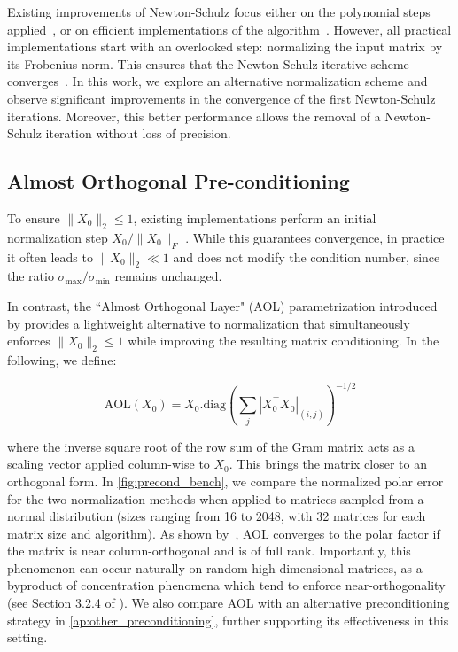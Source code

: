 Existing improvements of Newton-Schulz focus either on the polynomial steps applied~\cite{grishina_accelerating_2025, amsel2025polar}, or on efficient implementations of the algorithm~\cite{ahn_dion_2025}. However, all practical implementations start with an overlooked step: normalizing the input matrix by its Frobenius norm. This ensures that the Newton-Schulz iterative scheme converges~\cite{bjorck1971iterative}. In this work, we explore an alternative normalization scheme and observe significant improvements in the convergence of the first Newton-Schulz iterations. Moreover, this better performance allows the removal of a Newton-Schulz iteration without loss of precision.


\subsection{Almost Orthogonal Pre-conditioning}\label{ssec:AOLprecond}

To ensure $\|X_0\|_2\leq 1$, existing implementations perform an initial normalization step 
$X_0/\|X_0\|_F$
. While this guarantees convergence, in practice it often leads to $\|X_0\|_2\ll 1$ and does not modify the condition number, since the ratio $\sigma_{\max} / \sigma_{\min}$ remains unchanged.

In contrast, the ``Almost Orthogonal Layer" (AOL) parametrization introduced by \cite{prach2022almost} provides a lightweight alternative to normalization that simultaneously enforces $\|X_0\|_2\leq 1$ while improving the resulting matrix conditioning. In the following, we define: 

\begin{equation}
\text{AOL}(X_0) = X_0.\text{diag}\left(\sum_j |X_0^\top X_0|_{(i,j)}\right)^{-1/2} 
\label{eq:aol}
\end{equation}

where the inverse square root of the row sum of the Gram matrix acts as a scaling vector applied column-wise to $X_0$. This brings the matrix closer to an orthogonal form. In \cref{fig:precond_bench}, we compare the normalized polar error for the two normalization methods when applied to matrices sampled from a normal distribution (sizes ranging from 16 to 2048, with 32 matrices for each matrix size and algorithm).
As shown by~\citet{prach2022almost}, AOL converges to the polar factor if the matrix is near column-orthogonal and is of full rank. Importantly, this phenomenon can occur naturally on random high-dimensional matrices, as a byproduct of concentration phenomena which tend to enforce near-orthogonality (see Section 3.2.4 of \cite{vershynin2009high}). We also compare AOL with an alternative preconditioning strategy in \cref{ap:other_preconditioning}, further supporting its effectiveness in this setting.

